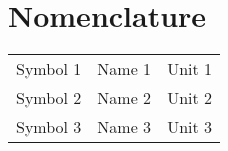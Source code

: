 \section{Nomenclature}

\begin{table}[H]
\label{nomenclature}
\begin{tabular}{lll}
Symbol 1 & Name 1 & Unit 1 \\
Symbol 2 & Name 2 & Unit 2 \\
Symbol 3 & Name 3 & Unit 3 \\
\end{tabular}
\end{table}
